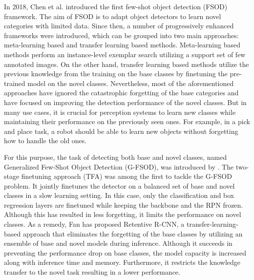 \documentclass[10pt,twocolumn,letterpaper]{article}
\begin{document}
In 2018, Chen et al. \cite{LSTD} introduced the first few-shot object detection (FSOD) framework. The aim of FSOD is to adapt object detectors to learn novel categories with limited data. Since  then,  a  number  of  progressively  enhanced  frameworks were introduced, which can be grouped into two main approaches: meta-learning based and transfer learning based methods. Meta-learning based methods \cite{RepMet, FSRW, MetaDet, MetaRCNN, FSOD-RPN, FsDetView, CME} perform an instance-level exemplar search utilizing a support set of few annotated images. On the other hand, transfer learning based methods \cite{LSTD, TFA, MPSR, FSCE} utilize the previous knowledge from the training on the base classes by finetuning the pre-trained model on the novel classes. Nevertheless, most of the aforementioned approaches have ignored the catastrophic forgetting of the base categories and have focused on improving the detection performance of the novel classes. But in  many use cases, it is crucial for perception systems to learn new classes while maintaining their performance on the previously seen ones. For example, in a pick and place task, a robot should be able to learn new objects without forgetting how to handle the old ones.

For this purpose, the task of detecting both base and novel classes, named Generalized Few-Shot Object Detection (G-FSOD), was introduced by \cite{TFA, gfsod}. The two-stage finetuning approach \cite{TFA} (TFA) was among the first to tackle the G-FSOD problem. It jointly finetunes the detector on a balanced set of base and novel classes in a slow learning setting.  In this case, only the classification and box regression layers are finetuned while keeping the backbone and the RPN frozen. Although this has resulted in less forgetting, it limits the performance on novel classes.  As a remedy, Fan \etal \cite{gfsod} has proposed Retentive R-CNN, a transfer-learning-based approach that eliminates the forgetting of the base classes by utilizing an ensemble of base and novel models during inference. Although it succeeds in preventing the performance drop on base classes, the model capacity is increased along with inference time and memory. Furthermore, it restricts the knowledge transfer to the novel task resulting in a lower performance. 
\end{document}
